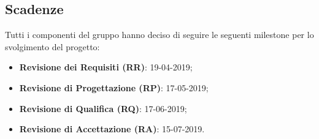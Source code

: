 \subsection{Scadenze}
Tutti i componenti del gruppo hanno deciso di seguire le seguenti milestone per lo svolgimento del progetto:
\begin{itemize}
    \item \textbf{Revisione dei Requisiti (RR)}: 19-04-2019;
    \item \textbf{Revisione di Progettazione (RP)}: 17-05-2019;
    \item \textbf{Revisione di Qualifica (RQ)}: 17-06-2019;
    \item \textbf{Revisione di Accettazione (RA)}: 15-07-2019.
\end{itemize}
